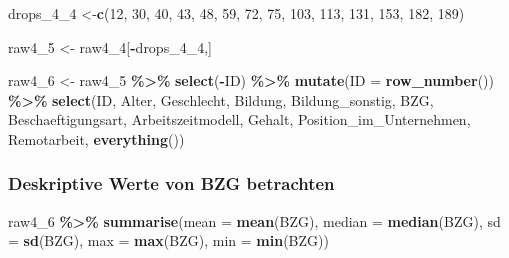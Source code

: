 \documentclass[
]{article}
\newenvironment{Shaded}{\begin{snugshade}}{\end{snugshade}}
\newcommand{\AttributeTok}[1]{\textcolor[rgb]{0.13,0.29,0.53}{#1}}
\newcommand{\DecValTok}[1]{\textcolor[rgb]{0.00,0.00,0.81}{#1}}
\newcommand{\FunctionTok}[1]{\textcolor[rgb]{0.13,0.29,0.53}{\textbf{#1}}}
\newcommand{\NormalTok}[1]{#1}
\newcommand{\OtherTok}[1]{\textcolor[rgb]{0.56,0.35,0.01}{#1}}
\newcommand{\SpecialCharTok}[1]{\textcolor[rgb]{0.81,0.36,0.00}{\textbf{#1}}}
\begin{document}
\begin{Shaded}
\begin{Highlighting}[]
\NormalTok{drops\_4\_4 }\OtherTok{\textless{}{-}}\FunctionTok{c}\NormalTok{(}\DecValTok{12}\NormalTok{, }\DecValTok{30}\NormalTok{, }\DecValTok{40}\NormalTok{, }\DecValTok{43}\NormalTok{, }\DecValTok{48}\NormalTok{, }\DecValTok{59}\NormalTok{, }\DecValTok{72}\NormalTok{, }\DecValTok{75}\NormalTok{, }\DecValTok{103}\NormalTok{, }\DecValTok{113}\NormalTok{, }\DecValTok{131}\NormalTok{, }\DecValTok{153}\NormalTok{, }\DecValTok{182}\NormalTok{, }\DecValTok{189}\NormalTok{)}
\end{Highlighting}
\end{Shaded}

\begin{Shaded}
\begin{Highlighting}[]
\NormalTok{raw4\_5 }\OtherTok{\textless{}{-}}\NormalTok{ raw4\_4[}\SpecialCharTok{{-}}\NormalTok{drops\_4\_4,]}
\end{Highlighting}
\end{Shaded}

\begin{Shaded}
\begin{Highlighting}[]
\NormalTok{raw4\_6 }\OtherTok{\textless{}{-}}\NormalTok{ raw4\_5 }\SpecialCharTok{\%\textgreater{}\%} 
  \FunctionTok{select}\NormalTok{(}\SpecialCharTok{{-}}\NormalTok{ID) }\SpecialCharTok{\%\textgreater{}\%} 
  \FunctionTok{mutate}\NormalTok{(}\AttributeTok{ID =} \FunctionTok{row\_number}\NormalTok{()) }\SpecialCharTok{\%\textgreater{}\%} 
  \FunctionTok{select}\NormalTok{(ID, Alter, Geschlecht, Bildung, Bildung\_sonstig, BZG, Beschaeftigungsart, Arbeitszeitmodell, Gehalt, Position\_im\_Unternehmen, Remotarbeit, }\FunctionTok{everything}\NormalTok{())}
\end{Highlighting}
\end{Shaded}

\subsubsection{Deskriptive Werte von BZG
betrachten}\label{deskriptive-werte-von-bzg-betrachten}

\begin{Shaded}
\begin{Highlighting}[]
\NormalTok{raw4\_6 }\SpecialCharTok{\%\textgreater{}\%} 
  \FunctionTok{summarise}\NormalTok{(}\AttributeTok{mean =} \FunctionTok{mean}\NormalTok{(BZG),}
            \AttributeTok{median =} \FunctionTok{median}\NormalTok{(BZG),}
         \AttributeTok{sd =} \FunctionTok{sd}\NormalTok{(BZG),}
         \AttributeTok{max =} \FunctionTok{max}\NormalTok{(BZG),}
         \AttributeTok{min =} \FunctionTok{min}\NormalTok{(BZG))}
\end{Highlighting}
\end{Shaded}
\end{document}
